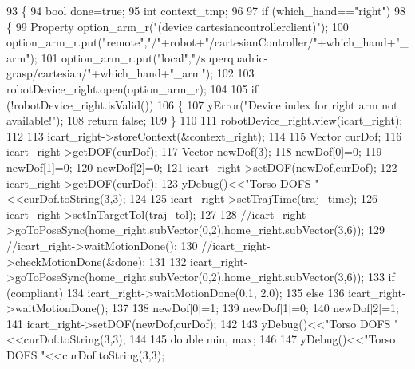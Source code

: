 \begin{DoxyCode}
93 \{
94     \textcolor{keywordtype}{bool} done=\textcolor{keyword}{true};
95     \textcolor{keywordtype}{int} context\_tmp;
96 
97     \textcolor{keywordflow}{if} (which\_hand==\textcolor{stringliteral}{"right"})
98     \{
99         Property option\_arm\_r(\textcolor{stringliteral}{"(device cartesiancontrollerclient)"});
100         option\_arm\_r.put(\textcolor{stringliteral}{"remote"},\textcolor{stringliteral}{"/"}+robot+\textcolor{stringliteral}{"/cartesianController/"}+which\_hand+\textcolor{stringliteral}{"\_arm"});
101         option\_arm\_r.put(\textcolor{stringliteral}{"local"},\textcolor{stringliteral}{"/superquadric-grasp/cartesian/"}+which\_hand+\textcolor{stringliteral}{"\_arm"});
102 
103         robotDevice\_right.open(option\_arm\_r);
104 
105         \textcolor{keywordflow}{if} (!robotDevice\_right.isValid())
106         \{
107             yError(\textcolor{stringliteral}{"Device index for right arm not available!"});
108             \textcolor{keywordflow}{return} \textcolor{keyword}{false};
109         \}
110 
111         robotDevice\_right.view(icart\_right);
112 
113         icart\_right->storeContext(&context\_right);
114 
115         Vector curDof;
116         icart\_right->getDOF(curDof);
117         Vector newDof(3);
118         newDof[0]=0;
119         newDof[1]=0;
120         newDof[2]=0;
121         icart\_right->setDOF(newDof,curDof);
122         icart\_right->getDOF(curDof);
123         yDebug()<<\textcolor{stringliteral}{"Torso DOFS "}<<curDof.toString(3,3);
124 
125         icart\_right->setTrajTime(traj\_time);
126         icart\_right->setInTargetTol(traj\_tol);
127 
128         \textcolor{comment}{//icart\_right->goToPoseSync(home\_right.subVector(0,2),home\_right.subVector(3,6));}
129         \textcolor{comment}{//icart\_right->waitMotionDone();}
130         \textcolor{comment}{//icart\_right->checkMotionDone(&done);}
131 
132         icart\_right->goToPoseSync(home\_right.subVector(0,2),home\_right.subVector(3,6));
133         \textcolor{keywordflow}{if} (compliant)
134             icart\_right->waitMotionDone(0.1, 2.0);
135         \textcolor{keywordflow}{else}
136             icart\_right->waitMotionDone();
137 
138         newDof[0]=1;
139         newDof[1]=0;
140         newDof[2]=1;
141         icart\_right->setDOF(newDof,curDof);
142 
143         yDebug()<<\textcolor{stringliteral}{"Torso DOFS "}<<curDof.toString(3,3);
144 
145         \textcolor{keywordtype}{double} min, max;
146 
147         yDebug()<<\textcolor{stringliteral}{"Torso DOFS "}<<curDof.toString(3,3);

\end{DoxyCode}
